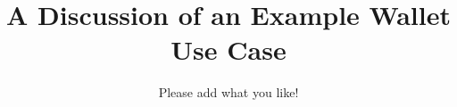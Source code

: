 \documentclass[letterpaper,10pt]{article}
\begin{document}
	
	\title{A Discussion of an Example Wallet Use Case}
	
	\author{%
		Please add what you like!
	}


		
	\maketitle





%		

	\newpage	




	
\end{document}

